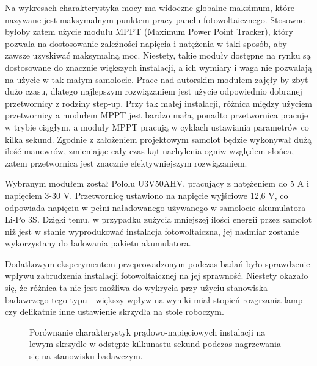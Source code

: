 \documentclass[12pt, a4paper]{article}
\begin{document}
Na wykresach charakterystyka mocy ma widoczne globalne maksimum, które nazywane jest maksymalnym punktem pracy panelu fotowoltaicznego. Stosowne byłoby zatem użycie modułu MPPT (Maximum Power Point Tracker), który pozwala na dostosowanie zależności napięcia i natężenia w taki sposób, aby zawsze uzyskiwać maksymalną moc. Niestety, takie moduły dostępne na rynku są dostosowane do znacznie większych instalacji, a ich wymiary i waga nie pozwalają na użycie w tak małym samolocie. Prace nad autorskim modułem zajęły by zbyt dużo czasu, dlatego najlepszym rozwiązaniem jest użycie odpowiednio dobranej przetwornicy z rodziny step-up. Przy tak małej instalacji, różnica między użyciem przetwornicy a modułem MPPT jest bardzo mała, ponadto przetwornica pracuje w trybie ciągłym, a moduły MPPT pracują w cyklach ustawiania parametrów co kilka sekund. Zgodnie z założeniem projektowym samolot będzie wykonywał dużą ilość manewrów, zmieniając cały czas kąt nachylenia ogniw względem słońca, zatem przetwornica jest znacznie efektywniejszym rozwiązaniem.

Wybranym modułem został Pololu U3V50AHV, pracujący z natężeniem do 5 A i napięciem 3-30 V. Przetwornicę ustawiono na napięcie wyjściowe 12,6 V, co odpowiada napięciu w pełni naładowanego używanego w samolocie akumulatora Li-Po 3S. Dzięki temu, w przypadku zużycia mniejszej ilości energii przez samolot niż jest w stanie wyprodukować instalacja fotowoltaiczna, jej nadmiar zostanie wykorzystany do ładowania pakietu akumulatora.

Dodatkowym eksperymentem przeprowadzonym podczas badań było sprawdzenie wpływu zabrudzenia instalacji fotowoltaicznej na jej sprawność. Niestety okazało się, że różnica ta nie jest możliwa do wykrycia przy użyciu stanowiska badawczego tego typu - większy wpływ na wyniki miał stopień rozgrzania lamp czy delikatnie inne ustawienie skrzydła na stole roboczym.

\begin{figure}[ht]
    \centering
    \qquad
    \caption{Porównanie charakterystyk prądowo-napięciowych instalacji na lewym skrzydle w odstępie kilkunastu sekund podczas nagrzewania się na stanowisku badawczym.}
    \label{fig:cieple}
\end{figure}
\end{document}
